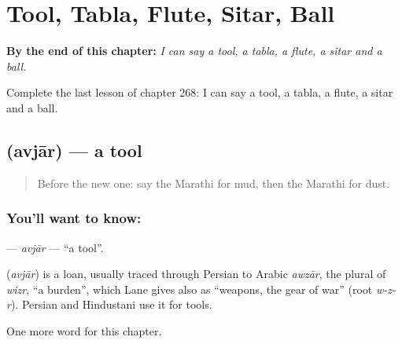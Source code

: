 
\chapter{Tool, Tabla, Flute, Sitar, Ball}
\label{ch:mr-tool-tabla-flute-sitar-ball}

\begin{chapteropening}
\textbf{By the end of this chapter:} \emph{I can say a tool, a tabla, a flute, a sitar and a ball.}

Complete the last lesson of chapter 268: I can say a tool, a tabla, a flute, a sitar and a ball.
\end{chapteropening}

\section[\texorpdfstring{\mr{अवजार} (avjār)}{अवजार (avjār)}]{ (avjār) — a tool}

\label{lesson:MR-C268-avjar}



\begin{quote}
Before the new one: say the Marathi for mud, then the Marathi for dust.
\end{quote}

\subsection*{You'll want to know: }
\textbf{} — \emph{avjār} — \textquotedblleft{}a tool\textquotedblright{}.

\begin{cousinweb}
\textbf{} (\emph{avjār}) is a loan, usually traced through Persian to Arabic \emph{awzār}, the plural of \emph{wizr}, \textquotedblleft{}a burden\textquotedblright{}, which Lane gives also as \textquotedblleft{}weapons, the gear of war\textquotedblright{} (root \emph{w-z-r}). Persian and Hindustani use it for tools.
\end{cousinweb}

\begin{grammarlens}[title={What you've built}]
One more word for this chapter.
\end{grammarlens}

